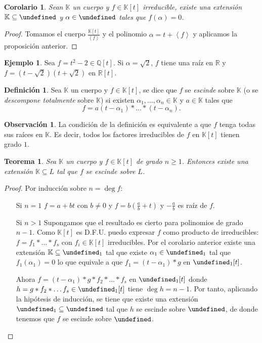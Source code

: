 \documentclass[10pt, spanish]{report}
\newtheorem*{tma}{Teorema}
\newtheorem*{cor}{Corolario}
\theoremstyle{definition}
\newtheorem*{defin}{Definición}
\newtheorem*{ej}{Ejemplo}
\newtheorem*{obs}{Observación}
\newcommand{\Q}{\mathbb{Q}}
\newcommand{\R}{\mathbb{R}}
\newcommand{\K}{\mathbb{K}}
\let\L\undefined
\newcommand{\L}{\mathbb{L}}
\renewcommand{\geq}{\geqslant}
\begin{document}
\begin{cor}
    Sean $\K$ un cuerpo y $f\in\K[t]$ irreducible, existe una extensión
    $\K\subseteq\L$ y $\alpha\in\L$ tales que $f(\alpha)=0$.
\end{cor}

\begin{proof}
    Tomamos el cuerpo $\frac{\K[t]}{\left< f \right> }$ y el polinomio
    $\alpha=t+\left< f \right>$  y aplicamos la proposición anterior.
\end{proof}

\begin{ej}
    Sea $f=t^2-2\in \Q[t]$. Si $\alpha=\sqrt{2}$, $f$  tiene una raíz en $\R$ y
    $f=(t-\sqrt{2})(t+\sqrt{2})$ en $\R[t]$.
\end{ej}

\begin{defin}
    Sea $\K$ un cuerpo y $f\in\K[t]$, se dice que $f$ se \textit{escinde} sobre
    $\K$ (o se \textit{descompone totalmente} sobre $\K$) si existen $\alpha_1,
    \ldots,\alpha_n\in\K$ y $a\in\K$ tales que
    \[f=a(t-\alpha_1)*\ldots*(t-\alpha_n).\]
\end{defin}

\begin{obs}
    La condición de la definición es equivalente a que $f$ tenga todas sus
    raíces en $\K$. Es decir, todos los factores irreducibles de $f$ en $\K[t]$
    tienen grado $1$.
\end{obs}

\begin{tma}
    Sea $\K$ un cuerpo y $f\in\K[t]$ de grado $n\geq1$. Entonces existe una
    extensión $\K\subseteq L$ tal que $f$ se escinde sobre $L$.
\end{tma}

\begin{proof}
    Por inducción sobre $n=\deg{f}$:
    \begin{itemize}[itemindent=30pt]
        \item[Si $n=1$] $f=a+bt$ con $b\neq 0$ y $f=b(\frac{a}{b}+t)$ y
            $-\frac{a}{b}$ es raíz de $f$.
        \item[Si $n>1$] Supongamos que el resultado es cierto para polinomios de
            grado $n-1$. Como $\K[t]$ es D.F.U. puedo expresar $f$
            como producto de irreducibles: $f=f_1*\ldots*f_s$ con $f_i\in\K[t]$
            irreducibles. Por el corolario anterior existe una extensión
            $\K\subseteq\L_1$ tal que existe $\alpha_1\in\L_1$ tal que
            $f_1(\alpha_1)=0$ lo que equivale a que $f_1=(t-\alpha_1)*g$ en
            $\L_1[t]$.

            Ahora $f=(t-\alpha_1)*g*f_2*\ldots*f_s$ en $\L_1[t]$ donde
            $h=g*f_2*\ldots f_s\in\L_1[t]$ tiene $\deg{h}=n-1$. Por tanto,
            aplicando la hipótesis de inducción, se tiene que existe una
            extensión $\L_1\subseteq\L$ tal que $h$ se escinde sobre $\L$, de
            donde tenemos que $f$ se escinde sobre $\L$.
    \end{itemize}
    \vspace{-1em}
\end{proof}
\end{document}
